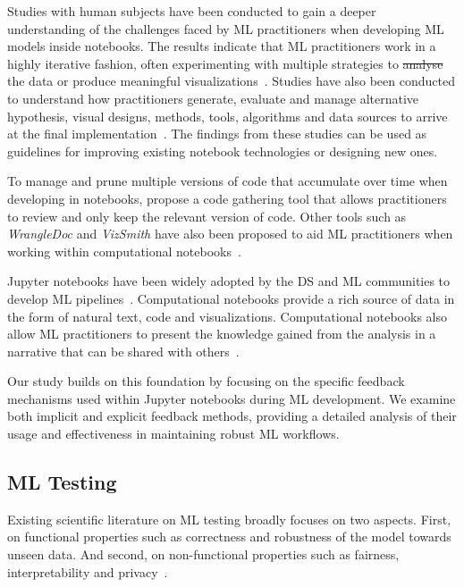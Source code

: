 \documentclass[smallextended]{svjour3}       %
\providecommand{\DIFadd}[1]{{\protect\color{blue}\uwave{#1}}} %
\providecommand{\DIFdel}[1]{{\protect\color{red}\sout{#1}}} %
\providecommand{\DIFaddbegin}{} %
\providecommand{\DIFaddend}{} %
\providecommand{\DIFdelbegin}{} %
\providecommand{\DIFdelend}{} %
\newcommand{\DIFscaledelfig}{0.5}
\newlength{\DIFdelgraphicswidth} %
\newlength{\DIFdelgraphicsheight} %
\newcommand{\DIFaddincludegraphics}[2][]{{\color{blue}\fbox{\DIFOincludegraphics[#1]{#2}}}} %
\newcommand{\DIFdelincludegraphics}[2][]{%
\sbox{\DIFdelgraphicsbox}{\DIFOincludegraphics[#1]{#2}}%
\settoboxwidth{\DIFdelgraphicswidth}{\DIFdelgraphicsbox} %
\settoboxtotalheight{\DIFdelgraphicsheight}{\DIFdelgraphicsbox} %
\scalebox{\DIFscaledelfig}{%
\parbox[b]{\DIFdelgraphicswidth}{\usebox{\DIFdelgraphicsbox}\\[-\baselineskip] \rule{\DIFdelgraphicswidth}{0em}}\llap{\resizebox{\DIFdelgraphicswidth}{\DIFdelgraphicsheight}{%
\setlength{\unitlength}{\DIFdelgraphicswidth}%
\begin{picture}(1,1)%
\thicklines\linethickness{2pt} %
{\color[rgb]{1,0,0}\put(0,0){\framebox(1,1){}}}%
{\color[rgb]{1,0,0}\put(0,0){\line( 1,1){1}}}%
{\color[rgb]{1,0,0}\put(0,1){\line(1,-1){1}}}%
\end{picture}%
}\hspace*{3pt}}} %
} %
\DeclareRobustCommand{\DIFaddbegin}{\DIFOaddbegin \let\includegraphics\DIFaddincludegraphics} %
\DeclareRobustCommand{\DIFaddend}{\DIFOaddend \let\includegraphics\DIFOincludegraphics} %
\DeclareRobustCommand{\DIFdelbegin}{\DIFOdelbegin \let\includegraphics\DIFdelincludegraphics} %
\DeclareRobustCommand{\DIFdelend}{\DIFOaddend \let\includegraphics\DIFOincludegraphics} %
\begin{document}
Studies with human subjects have been conducted to gain a deeper understanding of the challenges faced by ML practitioners when developing ML models inside notebooks. The results indicate that ML practitioners work in a highly iterative fashion, often experimenting with multiple strategies to \DIFdelbegin \DIFdel{analyse }\DIFdelend \DIFaddbegin \DIFadd{analyze }\DIFaddend the data or produce meaningful visualizations~\citep{kandel2012enterprise,kery2018story,liu2019understanding,chattopadhyay2020whats}. Studies have also been conducted to understand how practitioners generate, evaluate and manage alternative hypothesis, visual designs, methods, tools, algorithms and data sources to arrive at the final implementation~\citep{liu2019understanding,kandel2012enterprise}. The findings from these studies can be used as guidelines for improving existing notebook technologies or designing new ones.

To manage and prune multiple versions of code that accumulate over time when developing in notebooks, \citet{head2019managing} propose a code gathering tool that allows practitioners to review and only keep the relevant version of code. Other tools such as \textit{WrangleDoc} and \textit{VizSmith} have also been proposed to aid ML practitioners when working within computational notebooks~\citep{yang2021subtle,bavishi2021vizsmith}.

Jupyter notebooks have been widely adopted by the DS and ML communities to develop ML pipelines~\citep{wang2020assessing,pimentel2019large-scale,quaranta2021kgtorrent}. Computational notebooks provide a rich source of data in the form of natural text, code and visualizations. Computational notebooks also allow ML practitioners to present the knowledge gained from the analysis in a narrative that can be shared with others~\citep{rule2018exploration}.

Our study builds on this foundation by focusing on the specific feedback mechanisms used within Jupyter notebooks during ML development. We examine both implicit and explicit feedback methods, providing a detailed analysis of their usage and effectiveness in maintaining robust ML workflows.

\subsection{ML Testing}\label{sec:ml-testing}

Existing scientific literature on ML testing broadly focuses on two aspects. First, on functional properties such as correctness and robustness of the model towards unseen data. And second, on non-functional properties such as fairness, interpretability and privacy~\citep{zhang2022machine,mehrabi2021survey,chen2022fairness}.
\end{document}
